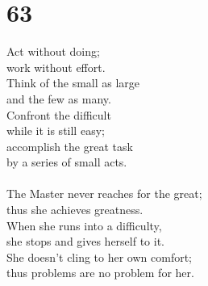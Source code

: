 \documentclass[b5paper, 12pt, oneside]{book}
\begin{document}
\chapter*{63}
Act without doing;\\
work without effort.\\
Think of the small as large\\
and the few as many.\\
Confront the difficult\\
while it is still easy;\\
accomplish the great task\\
by a series of small acts.\\
\\
The Master never reaches for the great;\\
thus she achieves greatness.\\
When she runs into a difficulty,\\
she stops and gives herself to it.\\
She doesn't cling to her own comfort;\\
thus problems are no problem for her.
\end{document}

